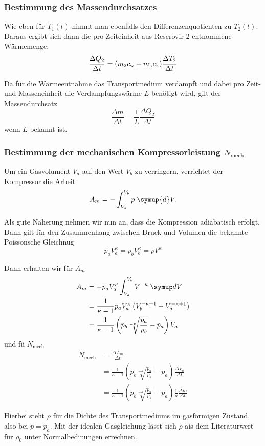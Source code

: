 \subsubsection{Bestimmung des Massendurchsatzes}

Wie eben für $T_1(t)$ nimmt man ebenfalls den Differenzenquotienten zu $T_2(t)$. Daraus 
ergibt sich dann die pro Zeiteinheit aus Reserovir 2 entnommene Wärmemenge:
\begin{equation}
	\frac{\Delta Q_2}{\Delta t}
	= (m_2 c_\text w + m_\text k c_\text k)  \frac{\Delta T_2}{\Delta t}
	\label{eqn:waermeleitung2}
\end{equation}

Da für die Wärmeentnahme das Transportmedium verdampft und dabei pro Zeit- und Masseneinheit die 
Verdampfungswärme $L$ benötigt wird, gilt der Massendurchsatz
\begin{equation}
	\frac{\Delta m}{\Delta t}
	=
	\frac{1}{L} \frac{\Delta Q_2}{\Delta t}
	\label{eqn:massendurchsatz}
\end{equation}
wenn $L$ bekannt ist.

\subsubsection{Bestimmung der mechanischen Kompressorleistung 
$N_\text{mech}$}

Um ein Gasvolument $V_a$ auf den Wert $V_b$ zu verringern, verrichtet der Kompressor die Arbeit
\begin{equation}
	A_m = 
	-\int_{V_a}^{V_b} p \; \symup{d}V.
	\label{eqn:arbeit-kompresion}
\end{equation}

Als gute N\"aherung nehmen wir nun an, dass die Kompression adiabatisch erfolgt. Dann gilt 
f\"ur den Zusammenhang zwischen Druck und Volumen die bekannte Poissonsche Gleichnug
\begin{equation}
	p_a V_a^\kappa = p_b V_b^\kappa = p V^\kappa
	\label{eqn:poissonsche_Gleichung}
\end{equation}

Dann erhalten wir f\"ur $A_m$
\begin{align}
	A_m 
	&= -p_a V_a^\kappa \int_{V_a}^{V_b} V^{-\kappa} \; \symup dV
	\\
	&= \frac{1}{\kappa - 1} p_a V_a^\kappa \left(V_b^{-\kappa+1} - V_a^{-\kappa +1} \right)
	\\
	&= \frac{1}{\kappa - 1} \left( p_b \sqrt[-\kappa]{\frac{p_a}{p_b}} - p_a \right) V_a
	\label{eqn:a_m}
\end{align}
und f\"u $N_\text{mech}$
\begin{align}
	N_\text{mech}
	&= \frac{\Delta A_m}{\Delta t}
	\\
	&= \frac{1}{\kappa - 1}  \left( p_b \sqrt[-\kappa]{\frac{p_a}{p_b}} - p_a \right) 
	\frac{\Delta V_a}{\Delta t}
	\\
	&=  \frac{1}{\kappa - 1}  \left( p_b \sqrt[-\kappa]{\frac{p_a}{p_b}} - p_a \right)
	\frac{1}{\rho} \frac{\Delta m}{\Delta t}
	\label{eqn:kompressorleistung}
\end{align}

Hierbei steht $\rho$ f\"ur die Dichte des Transportmediums im gasf\"ormigen Zustand, also 
bei $p = p_a$. Mit der idealen Gasgleichung l\"asst sich $\rho$ ais dem Literaturwert f\"ur
$\rho_0$ unter Normalbedinungen errechnen.
